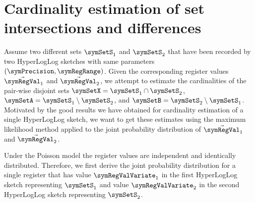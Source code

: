 \documentclass[11pt]{article} %
\begin{document}
\section{Cardinality estimation of set intersections and differences}
Assume two different sets $\symSetS_1$ and $\symSetS_2$ that have been recorded by two HyperLogLog sketches with same parameters $(\symPrecision,\symRegRange)$. Given the corresponding register values $\vec{\symRegVal}_1$ and
$\vec{\symRegVal}_2$, we attempt to estimate the cardinalities of the pair-wise disjoint sets $\symSetX = \symSetS_1\cap\symSetS_2$, $\symSetA = \symSetS_1\setminus\symSetS_2$, and $\symSetB = \symSetS_2\setminus\symSetS_1$. Motivated by the good results we have obtained for cardinality estimation of a single HyperLogLog sketch, we want to get these estimates using the maximum likelihood method applied to the joint probability distribution of $\vec{\symRegVal}_1$ and $\vec{\symRegVal}_2$.

Under the Poisson model the register values are independent and identically distributed. Therefore, we first derive the joint probability distribution for a single register that has value $\symRegValVariate_1$ in the first HyperLogLog sketch representing $\symSetS_1$ and value $\symRegValVariate_2$ in the second HyperLogLog sketch representing $\symSetS_2$. 
\end{document}
